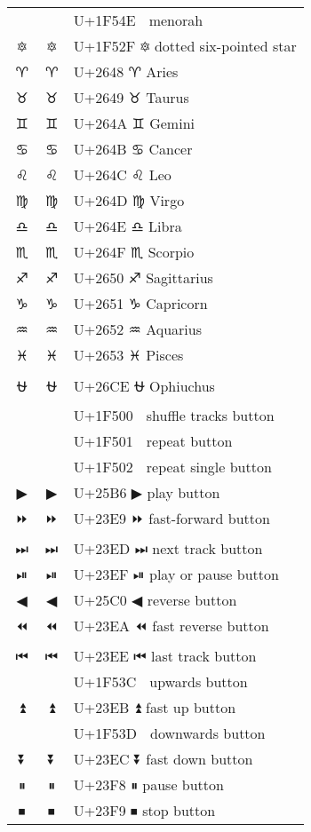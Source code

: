 \documentclass[a4paper,12pt]{article}
\newcommand{\fontA}[1]{{\fontspec[RawFeature={mode=harf,+dist,+ccmp}]{Segoe UI Emoji} #1}}
\newcommand{\fontB}[1]{{\fontspec[RawFeature={mode=harf,+dist,+ccmp}]{Noto Color Emoji} #1}}
\begin{document}
\begin{longtable}[c]{ccp{0.8\linewidth}}
\fontA{🕎}&\fontB{🕎}&U+1F54E 🕎 menorah\\
\fontA{🔯}&\fontB{🔯}&U+1F52F 🔯 dotted six-pointed star\\
\fontA{♈}&\fontB{♈}&U+2648 ♈ Aries\\
\fontA{♉}&\fontB{♉}&U+2649 ♉ Taurus\\
\fontA{♊}&\fontB{♊}&U+264A ♊ Gemini\\
\fontA{♋}&\fontB{♋}&U+264B ♋ Cancer\\
\fontA{♌}&\fontB{♌}&U+264C ♌ Leo\\
\fontA{♍}&\fontB{♍}&U+264D ♍ Virgo\\
\fontA{♎}&\fontB{♎}&U+264E ♎ Libra\\
\fontA{♏}&\fontB{♏}&U+264F ♏ Scorpio\\
\fontA{♐}&\fontB{♐}&U+2650 ♐ Sagittarius\\
\fontA{♑}&\fontB{♑}&U+2651 ♑ Capricorn\\
\fontA{♒}&\fontB{♒}&U+2652 ♒ Aquarius\\
\fontA{♓}&\fontB{♓}&U+2653 ♓ Pisces\\
\fontA{⛎}&\fontB{⛎}&U+26CE ⛎ Ophiuchus\\
\fontA{🔀}&\fontB{🔀}&U+1F500 🔀 shuffle tracks button\\
\fontA{🔁}&\fontB{🔁}&U+1F501 🔁 repeat button\\
\fontA{🔂}&\fontB{🔂}&U+1F502 🔂 repeat single button\\
\fontA{▶}&\fontB{▶}&U+25B6 ▶ play button\\
\fontA{⏩}&\fontB{⏩}&U+23E9 ⏩ fast-forward button\\
\fontA{⏭}&\fontB{⏭}&U+23ED ⏭ next track button\\
\fontA{⏯}&\fontB{⏯}&U+23EF ⏯ play or pause button\\
\fontA{◀}&\fontB{◀}&U+25C0 ◀ reverse button\\
\fontA{⏪}&\fontB{⏪}&U+23EA ⏪ fast reverse button\\
\fontA{⏮}&\fontB{⏮}&U+23EE ⏮ last track button\\
\fontA{🔼}&\fontB{🔼}&U+1F53C 🔼 upwards button\\
\fontA{⏫}&\fontB{⏫}&U+23EB ⏫ fast up button\\
\fontA{🔽}&\fontB{🔽}&U+1F53D 🔽 downwards button\\
\fontA{⏬}&\fontB{⏬}&U+23EC ⏬ fast down button\\
\fontA{⏸}&\fontB{⏸}&U+23F8 ⏸ pause button\\
\fontA{⏹}&\fontB{⏹}&U+23F9 ⏹ stop button\\

\end{longtable}
\end{document}
